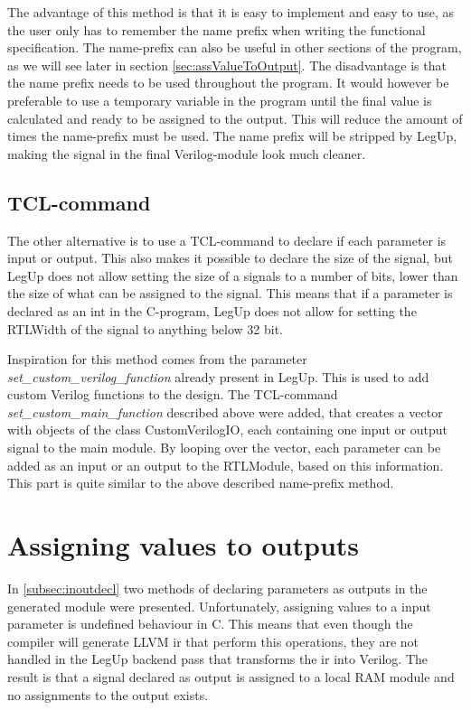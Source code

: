 The advantage of this method is that it is easy to implement and easy to use, as the user only has to remember the name prefix when writing the functional specification. The name-prefix can also be useful in other sections of the program, as we will see later in section \ref{sec:assValueToOutput}. The disadvantage is that the name prefix needs to be used throughout the program. It would however be preferable to use a temporary variable in the program until the final value is calculated and ready to be assigned to the output. This will reduce the amount of times the name-prefix must be used. The name prefix will be stripped by LegUp, making the signal in the final Verilog-module look much cleaner.
\subsection{\label{subsubsec:inoutparameter}TCL-command}
The other alternative is to use a TCL-command to declare if each parameter is input or output. This also makes it possible to declare the size of the signal, but LegUp does not allow setting the size of a signals to a number of bits, lower than the size of what can be assigned to the signal. This means that if a parameter is declared as an int in the C-program, LegUp does not allow for setting the RTLWidth of the signal to anything below 32 bit.

Inspiration for this method comes from the parameter \textit{set\_custom\_verilog\_function} already present in LegUp. This is used to add custom Verilog functions to the design. The TCL-command \textit{set\_custom\_main\_function} described above were added, that creates a vector with objects of the class CustomVerilogIO, each containing one input or output signal to the main module. By looping over the vector, each parameter can be added as an input or an output to the RTLModule, based on this information. This part is quite similar to the above described name-prefix method.

\section{\label{sec:assValueToOutput}Assigning values to outputs}
In \cref{subsec:inoutdecl} two methods of declaring parameters as outputs in the generated module were presented. Unfortunately, assigning values to a input parameter is undefined behaviour in C. This means that even though the compiler will generate LLVM \gls{ir} that perform this operations, they are not handled in the LegUp backend pass that transforms the \gls{ir} into Verilog. The result is that a signal declared as output is assigned to a local RAM module and no assignments to the output exists.

